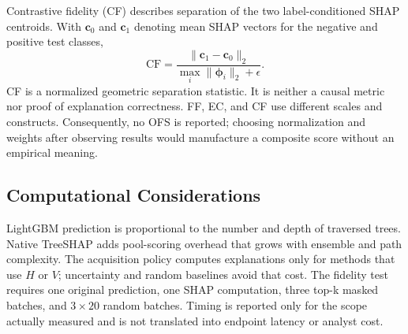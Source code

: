 Contrastive fidelity (CF) describes separation of the two label-conditioned SHAP
centroids. With $\boldsymbol{c}_0$ and $\boldsymbol{c}_1$ denoting mean SHAP
vectors for the negative and positive test classes,
\begin{equation}
\mathrm{CF}=\frac{\|\boldsymbol{c}_1-\boldsymbol{c}_0\|_2}
{\max_i\|\boldsymbol{\phi}_i\|_2+\epsilon}.
\label{eq:cf}
\end{equation}
CF is a normalized geometric separation statistic. It is neither a causal metric
nor proof of explanation correctness. FF, EC, and CF use different scales and
constructs. Consequently, no OFS is reported; choosing normalization and weights
after observing results would manufacture a composite score without an empirical
meaning.

\subsection{Computational Considerations}

LightGBM prediction is proportional to the number and depth of traversed trees.
Native TreeSHAP adds pool-scoring overhead that grows with ensemble and path
complexity. The acquisition policy computes explanations only for methods that
use $H$ or $V$; uncertainty and random baselines avoid that cost. The fidelity
test requires one original prediction, one SHAP computation, three top-k masked
batches, and $3\times20$ random batches. Timing is reported only for the scope
actually measured and is not translated into endpoint latency or analyst cost.
